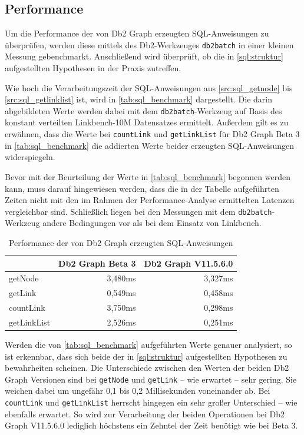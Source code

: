 \subsection{Performance}
\label{sql:performance}
Um die Performance der von Db2 Graph erzeugten SQL-Anweisungen zu überprüfen, werden diese mittels des Db2-Werkzeuges \texttt{db2batch} in einer kleinen Messung gebenchmarkt. Anschließend wird überprüft, ob die in \autoref{sql:struktur} aufgestellten Hypothesen in der Praxis zutreffen.

Wie hoch die Verarbeitungszeit der SQL-Anweisungen aus \autoref{src:sql_getnode} bis \ref{src:sql_getlinklist} ist, wird in \autoref{tab:sql_benchmark} dargestellt. Die darin abgebildeten Werte werden dabei mit dem \texttt{db2batch}-Werkzeug auf Basis des konstant verteilten Linkbench-10M Datensatzes ermittelt.  Außerdem gilt es zu erwähnen, dass die Werte bei \texttt{countLink} und \texttt{getLinkList} für Db2 Graph Beta 3 in \autoref{tab:sql_benchmark} die addierten Werte beider erzeugten SQL-Anweisungen widerspiegeln. 

Bevor mit der Beurteilung der Werte in \autoref{tab:sql_benchmark} begonnen werden kann, muss darauf hingewiesen werden, dass die in der Tabelle aufgeführten Zeiten nicht mit den im Rahmen der Performance-Analyse ermittelten Latenzen vergleichbar sind. Schließlich liegen bei den Messungen mit dem \texttt{db2batch}-Werkzeug andere Bedingungen vor als bei dem Einsatz von Linkbench. 

\begin{table}[!ht]
    \centering
    \begin{tabular}{l|r|r}
    \hline
    \rowcolor[HTML]{EFEFEF} 
    \multicolumn{1}{c|}{\cellcolor[HTML]{EFEFEF}{\color[HTML]{333333} \textbf{SQL-Anweisung}}} & \multicolumn{1}{c|}{\cellcolor[HTML]{EFEFEF}\textbf{Db2 Graph Beta 3}} & \multicolumn{1}{c}{\cellcolor[HTML]{EFEFEF}\textbf{Db2 Graph V11.5.6.0}} \\ \hline
    getNode & 3,480ms & 3,327ms \\
    getLink & 0,549ms & 0,458ms \\
    countLink & 3,750ms & 0,298ms \\
    getLinkList & 2,526ms & 0,251ms \\ \hline
    \end{tabular}
    \caption{Performance der von Db2 Graph erzeugten SQL-Anweisungen}
    \label{tab:sql_benchmark}
\end{table}

Werden die von \autoref{tab:sql_benchmark} aufgeführten Werte genauer analysiert, so ist erkennbar, dass sich beide der in \autoref{sql:struktur} aufgestellten Hypothesen zu bewahrheiten scheinen. Die Unterschiede zwischen den Werten der beiden Db2 Graph Versionen sind bei \texttt{getNode} und \texttt{getLink} -- wie erwartet -- sehr gering. Sie weichen dabei um ungefähr 0,1 bis 0,2 Millisekunden voneinander ab. Bei \texttt{countLink} und \texttt{getLinkList} herrscht hingegen ein sehr großer Unterschied -- wie ebenfalls erwartet. So wird zur Verarbeitung der beiden Operationen bei Db2 Graph V11.5.6.0 lediglich höchstens ein Zehntel der Zeit benötigt wie bei Beta 3. 

